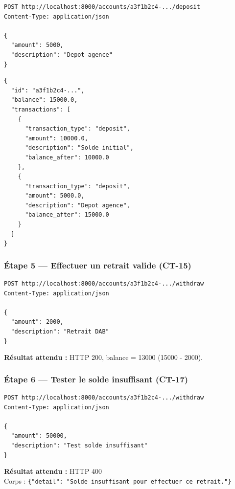 \documentclass[12pt,a4paper]{article}
\begin{document}
\begin{lstlisting}[style=bash, caption={Appel POST /accounts/\{id\}/deposit}]
POST http://localhost:8000/accounts/a3f1b2c4-.../deposit
Content-Type: application/json

{
  "amount": 5000,
  "description": "Depot agence"
}
\end{lstlisting}

\begin{lstlisting}[style=json, caption={Reponse attendue — HTTP 200, balance = 15000}]
{
  "id": "a3f1b2c4-...",
  "balance": 15000.0,
  "transactions": [
    {
      "transaction_type": "deposit",
      "amount": 10000.0,
      "description": "Solde initial",
      "balance_after": 10000.0
    },
    {
      "transaction_type": "deposit",
      "amount": 5000.0,
      "description": "Depot agence",
      "balance_after": 15000.0
    }
  ]
}
\end{lstlisting}

\subsubsection{Étape 5 — Effectuer un retrait valide (CT-15)}

\begin{lstlisting}[style=bash, caption={Appel POST /accounts/\{id\}/withdraw}]
POST http://localhost:8000/accounts/a3f1b2c4-.../withdraw
Content-Type: application/json

{
  "amount": 2000,
  "description": "Retrait DAB"
}
\end{lstlisting}

\begin{successbox}
\textbf{Résultat attendu :} HTTP 200, balance = 13000 (15000 - 2000).
\end{successbox}

\subsubsection{Étape 6 — Tester le solde insuffisant (CT-17)}

\begin{lstlisting}[style=bash, caption={Test CT-17 : retrait impossible}]
POST http://localhost:8000/accounts/a3f1b2c4-.../withdraw
Content-Type: application/json

{
  "amount": 50000,
  "description": "Test solde insuffisant"
}
\end{lstlisting}

\begin{dangerbox}
\textbf{Résultat attendu :} HTTP 400\\
Corps : \texttt{\{"detail": "Solde insuffisant pour effectuer ce retrait."\}}
\end{dangerbox}
\end{document}
